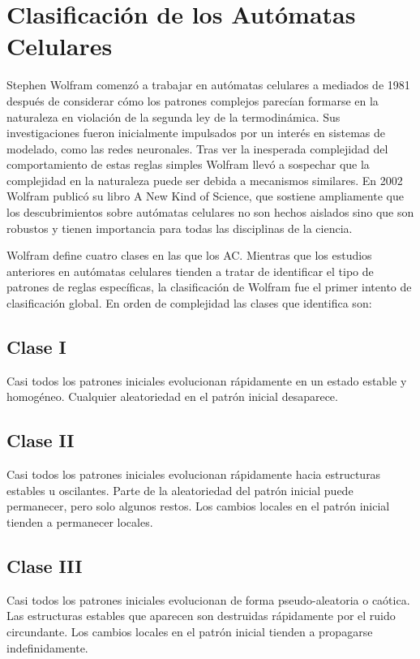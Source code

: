 \documentclass[11pt]{article}
\begin{document}
	
	
	\section{Clasificación de los Autómatas Celulares}
	Stephen Wolfram comenzó a trabajar en autómatas celulares a mediados de 1981 después de considerar cómo los patrones complejos parecían formarse en la naturaleza en violación de la segunda ley de la termodinámica. Sus investigaciones fueron inicialmente impulsados por un interés en sistemas de modelado, como las redes neuronales. Tras ver la inesperada complejidad del comportamiento de estas reglas simples Wolfram llevó a sospechar que la complejidad en la naturaleza puede ser debida a mecanismos similares. En 2002 Wolfram publicó su libro A New Kind of Science, que sostiene ampliamente que los descubrimientos sobre autómatas celulares no son hechos aislados sino que son robustos y tienen importancia para todas las disciplinas de la ciencia. 

	Wolfram define cuatro clases en las que los AC. Mientras que los estudios anteriores en autómatas celulares tienden a tratar de identificar el tipo de patrones de reglas específicas, la clasificación de Wolfram fue el primer intento de clasificación global. En orden de complejidad las clases que identifica son:
		
		\subsection{Clase I}
		Casi todos los patrones iniciales evolucionan rápidamente en un estado estable y homogéneo. Cualquier aleatoriedad en el patrón inicial desaparece.
			
		\subsection{Clase II}
		Casi todos los patrones iniciales evolucionan rápidamente hacia estructuras estables u oscilantes. Parte de la aleatoriedad del patrón inicial puede permanecer, pero solo algunos restos. Los cambios locales en el patrón inicial tienden a permanecer locales.
			
		\subsection{Clase III} 
		Casi todos los patrones iniciales evolucionan de forma pseudo-aleatoria o caótica. Las estructuras estables que aparecen son destruidas rápidamente por el ruido circundante. Los cambios locales en el patrón inicial tienden a propagarse indefinidamente.
			
\end{document}
